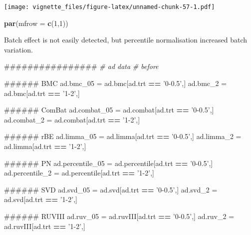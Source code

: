 \documentclass[]{book}
\newenvironment{Shaded}{\begin{snugshade}}{\end{snugshade}}
\newcommand{\KeywordTok}[1]{\textcolor[rgb]{0.13,0.29,0.53}{\textbf{#1}}}
\newcommand{\DataTypeTok}[1]{\textcolor[rgb]{0.13,0.29,0.53}{#1}}
\newcommand{\DecValTok}[1]{\textcolor[rgb]{0.00,0.00,0.81}{#1}}
\newcommand{\StringTok}[1]{\textcolor[rgb]{0.31,0.60,0.02}{#1}}
\newcommand{\CommentTok}[1]{\textcolor[rgb]{0.56,0.35,0.01}{\textit{#1}}}
\newcommand{\OperatorTok}[1]{\textcolor[rgb]{0.81,0.36,0.00}{\textbf{#1}}}
\newcommand{\NormalTok}[1]{#1}
\begin{document}
\texttt{[image: vignette\_files/figure-latex/unnamed-chunk-57-1.pdf]}

\begin{Shaded}
\begin{Highlighting}[]
\KeywordTok{par}\NormalTok{(}\DataTypeTok{mfrow =} \KeywordTok{c}\NormalTok{(}\DecValTok{1}\NormalTok{,}\DecValTok{1}\NormalTok{))}
\end{Highlighting}
\end{Shaded}

Batch effect is not easily detected, but percentile normalisation
increased batch variation.

\begin{Shaded}
\begin{Highlighting}[]
\NormalTok{################}
\CommentTok{# ad data}
\CommentTok{# before}

\NormalTok{###### BMC}
\NormalTok{ad.bmc_}\DecValTok{05}\NormalTok{ =}\StringTok{ }\NormalTok{ad.bmc[ad.trt }\OperatorTok{==}\StringTok{ '0-0.5'}\NormalTok{,]}
\NormalTok{ad.bmc_}\DecValTok{2}\NormalTok{ =}\StringTok{ }\NormalTok{ad.bmc[ad.trt }\OperatorTok{==}\StringTok{ '1-2'}\NormalTok{,]}

\NormalTok{###### ComBat}
\NormalTok{ad.combat_}\DecValTok{05}\NormalTok{ =}\StringTok{ }\NormalTok{ad.combat[ad.trt }\OperatorTok{==}\StringTok{ '0-0.5'}\NormalTok{,]}
\NormalTok{ad.combat_}\DecValTok{2}\NormalTok{ =}\StringTok{ }\NormalTok{ad.combat[ad.trt }\OperatorTok{==}\StringTok{ '1-2'}\NormalTok{,]}

\NormalTok{###### rBE}
\NormalTok{ad.limma_}\DecValTok{05}\NormalTok{ =}\StringTok{ }\NormalTok{ad.limma[ad.trt }\OperatorTok{==}\StringTok{ '0-0.5'}\NormalTok{,]}
\NormalTok{ad.limma_}\DecValTok{2}\NormalTok{ =}\StringTok{ }\NormalTok{ad.limma[ad.trt }\OperatorTok{==}\StringTok{ '1-2'}\NormalTok{,]}

\NormalTok{###### PN}
\NormalTok{ad.percentile_}\DecValTok{05}\NormalTok{ =}\StringTok{ }\NormalTok{ad.percentile[ad.trt }\OperatorTok{==}\StringTok{ '0-0.5'}\NormalTok{,]}
\NormalTok{ad.percentile_}\DecValTok{2}\NormalTok{ =}\StringTok{ }\NormalTok{ad.percentile[ad.trt }\OperatorTok{==}\StringTok{ '1-2'}\NormalTok{,]}

\NormalTok{###### SVD}
\NormalTok{ad.svd_}\DecValTok{05}\NormalTok{ =}\StringTok{ }\NormalTok{ad.svd[ad.trt }\OperatorTok{==}\StringTok{ '0-0.5'}\NormalTok{,]}
\NormalTok{ad.svd_}\DecValTok{2}\NormalTok{ =}\StringTok{ }\NormalTok{ad.svd[ad.trt }\OperatorTok{==}\StringTok{ '1-2'}\NormalTok{,]}

\NormalTok{###### RUVIII}
\NormalTok{ad.ruv_}\DecValTok{05}\NormalTok{ =}\StringTok{ }\NormalTok{ad.ruvIII[ad.trt }\OperatorTok{==}\StringTok{ '0-0.5'}\NormalTok{,]}
\NormalTok{ad.ruv_}\DecValTok{2}\NormalTok{ =}\StringTok{ }\NormalTok{ad.ruvIII[ad.trt }\OperatorTok{==}\StringTok{ '1-2'}\NormalTok{,]}
\end{Highlighting}
\end{Shaded}
\end{document}
